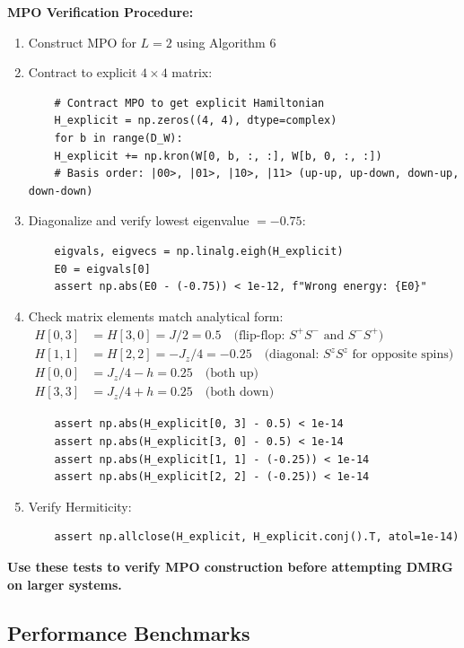 \documentclass[aps,prb,onecolumn,scriptaddress]{revtex4-2}
\begin{document}
\textbf{MPO Verification Procedure:}
\begin{enumerate}
\item Construct MPO for $L=2$ using Algorithm 6
\item Contract to explicit $4 \times 4$ matrix:
\begin{verbatim}
	# Contract MPO to get explicit Hamiltonian
	H_explicit = np.zeros((4, 4), dtype=complex)
	for b in range(D_W):
	H_explicit += np.kron(W[0, b, :, :], W[b, 0, :, :])
	# Basis order: |00>, |01>, |10>, |11> (up-up, up-down, down-up, down-down)
\end{verbatim}

\item Diagonalize and verify lowest eigenvalue $= -0.75$:
\begin{verbatim}
	eigvals, eigvecs = np.linalg.eigh(H_explicit)
	E0 = eigvals[0]
	assert np.abs(E0 - (-0.75)) < 1e-12, f"Wrong energy: {E0}"
\end{verbatim}

\item Check matrix elements match analytical form:
\begin{align}
	H[0,3] &= H[3,0] = J/2 = 0.5 \quad \text{(flip-flop: $S^+S^-$ and $S^-S^+$)} \\
	H[1,1] &= H[2,2] = -J_z/4 = -0.25 \quad \text{(diagonal: $S^z S^z$ for opposite spins)} \\
	H[0,0] &= J_z/4 - h = 0.25 \quad \text{(both up)} \\
	H[3,3] &= J_z/4 + h = 0.25 \quad \text{(both down)}
\end{align}

\begin{verbatim}
	assert np.abs(H_explicit[0, 3] - 0.5) < 1e-14
	assert np.abs(H_explicit[3, 0] - 0.5) < 1e-14
	assert np.abs(H_explicit[1, 1] - (-0.25)) < 1e-14
	assert np.abs(H_explicit[2, 2] - (-0.25)) < 1e-14
\end{verbatim}

\item Verify Hermiticity:
\begin{verbatim}
	assert np.allclose(H_explicit, H_explicit.conj().T, atol=1e-14)
\end{verbatim}
\end{enumerate}

\textbf{Use these tests to verify MPO construction before attempting DMRG on larger systems.}

\subsection{Performance Benchmarks}
\end{document}
